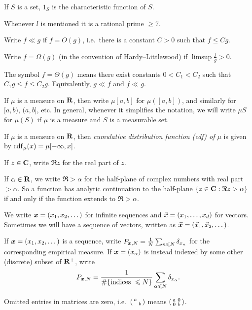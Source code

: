 If $S$ is a set, $1_S$ is the characteristic function of $S$. 

Whenever $l$ is mentioned it is a rational prime $\geqslant 7$. 

Write $f\ll g$ if $f = O(g)$, i.e.~there is a constant $C>0$ such that 
$f \leqslant C g$. 

Write $f=\Omega(g)$ (in the convention of Hardy--Littlewood) if 
$\limsup \frac f g > 0$. 

The symbol $f = \Theta(g)$ means there exist constants $0<C_1<C_2$ such that 
$C_1 g \leqslant f \leqslant C_2 g$. Equivalently, $g \ll f$ and $f \ll g$. 

If $\mu$ is a measure on $\mathbf{R}$, then write $\mu[a,b]$ for $\mu([a,b])$, and 
similarly for $[a,b)$, $(a,b]$, etc. In general, whenever it simplifies the 
notation, we will write $\mu S$ for $\mu(S)$ if $\mu$ is a measure and 
$S$ is a measurable set. 

If $\mu$ is a measure on $\mathbf{R}$, then \emph{cumulative distribution function 
(cdf) of $\mu$} is given by $\operatorname{cdf}_\mu(x) = \mu[-\infty,x]$. 

If $z\in \mathbf{C}$, write $\Re z$ for the real part of $z$. 

If $\alpha\in \mathbf{R}$, we write $\Re > \alpha$ for the half-plane of complex 
numbers with real part $> \alpha$. So a function has analytic continuation to 
the half-plane $\{z\in \mathbf{C} : \Re z > \alpha\}$ if and only if the function 
extends to $\Re > \alpha$. 

We write ${\boldsymbol x} = (x_1,x_2,\dots)$ for infinite sequences and 
$\vec{x} = (x_1,\dots,x_d)$ for vectors. Sometimes we will have a sequence of 
vectors, written as $\vec{\boldsymbol x} = (\vec{x}_1,\vec{x}_2,\dots)$. 

If ${\boldsymbol x}=(x_1,x_2,\dots)$ is a sequence, write 
$P_{{\boldsymbol x},N} = \frac{1}{N} \sum_{n\leqslant N} \delta_{x_n}$ for the 
corresponding empirical measure. If ${\boldsymbol x}=(x_\alpha)$ is instead indexed by 
some other (discrete) subset of $\mathbf{R}^+$, write 
\[
	P_{{\boldsymbol x},N} = \frac{1}{\# \{\text{indices }\leqslant N\}}\sum_{\alpha \leqslant N} \delta_{x_\alpha} .
\]

Omitted entries in matrices are zero, i.e.~$\left(\begin{smallmatrix} a &  \\  & b \end{smallmatrix}\right)$ means 
$\left(\begin{smallmatrix} a & 0 \\ 0 & b \end{smallmatrix}\right)$. 
